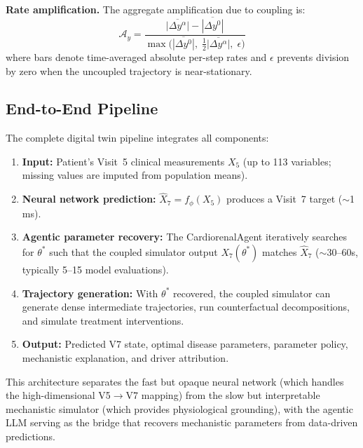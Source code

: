 \documentclass[pmlr]{jmlr}
\begin{document}
\textbf{Rate amplification.} The aggregate amplification due to coupling is:
\begin{equation}
\mathcal{A}_y = \frac{\overline{|\Delta y^{\alpha}|} - \overline{|\Delta y^{0}|}}{\max\bigl(\overline{|\Delta y^{0}|},\; \tfrac{1}{2}\overline{|\Delta y^{\alpha}|},\; \epsilon\bigr)}
\label{eq:amplification}
\end{equation}
where bars denote time-averaged absolute per-step rates and $\epsilon$ prevents division by zero when the uncoupled trajectory is near-stationary.

\subsection{End-to-End Pipeline}
\label{sec:pipeline}

The complete digital twin pipeline integrates all components:
\begin{enumerate}
\item \textbf{Input:} Patient's Visit~5 clinical measurements $X_5$ (up to 113 variables; missing values are imputed from population means).
\item \textbf{Neural network prediction:} $\hat{X}_7 = f_\phi(X_5)$ produces a Visit~7 target ($\sim$1\,ms).
\item \textbf{Agentic parameter recovery:} The CardiorenalAgent iteratively searches for $\theta^*$ such that the coupled simulator output $X_7(\theta^*)$ matches $\hat{X}_7$ ($\sim$30--60s, typically 5--15 model evaluations).
\item \textbf{Trajectory generation:} With $\theta^*$ recovered, the coupled simulator can generate dense intermediate trajectories, run counterfactual decompositions, and simulate treatment interventions.
\item \textbf{Output:} Predicted V7 state, optimal disease parameters, parameter policy, mechanistic explanation, and driver attribution.
\end{enumerate}

This architecture separates the fast but opaque neural network (which handles the high-dimensional V5$\to$V7 mapping) from the slow but interpretable mechanistic simulator (which provides physiological grounding), with the agentic LLM serving as the bridge that recovers mechanistic parameters from data-driven predictions.




\end{document}
